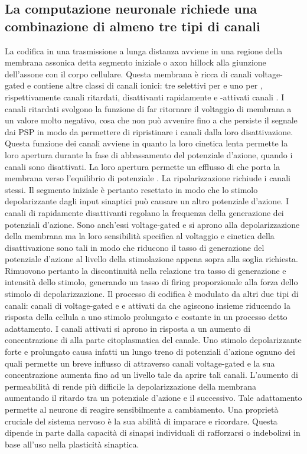 \subsection{La computazione neuronale richiede una combinazione di almeno tre tipi di canali }
La codifica in una trasmissione a lunga distanza avviene in una regione della membrana assonica detta segmento iniziale o axon hillock alla giunzione dell'assone con il corpo cellulare.
Questa membrana \`e ricca di canali  voltage-gated e contiene altre classi di canali ionici: tre selettivi per  e uno per , rispettivamente canali 
ritardati, disattivanti rapidamente e -attivati canali . I canali  ritardati svolgono la funzione di far ritornare il voltaggio di membrana a un valore molto
negativo, cosa che non pu\`o avvenire fino a che persiste il segnale dai PSP in modo da permettere di ripristinare i canali  dalla loro disattivazione. Questa funzione dei
canali  avviene in quanto la loro cinetica lenta  permette la loro apertura durante la fase di abbassamento del potenziale d'azione, quando i canali  sono disattivati. 
La loro apertura permette un efflusso di  che porta la membrana verso l'equilibrio di potenziale . La ripolarizzazione richiude i canali stessi. Il segmento iniziale \`e
pertanto resettato in modo che lo stimolo depolarizzante dagli input sinaptici pu\`o causare un altro potenziale d'azione. I canali di  rapidamente disattivanti regolano la
frequenza della generazione dei potenziali d'azione. Sono anch'essi voltage-gated e si aprono alla depolarizzazione della membrana ma la loro sensibilit\`a specifica al voltaggio
e cinetica della disattivazione sono tali in modo che riducono il tasso di generazione del potenziale d'azione al livello della stimolazione appena sopra alla soglia richiesta. 
Rimuovono pertanto la discontinuit\`a nella relazione tra tasso di generazione e intensit\`a dello stimolo, generando un tasso di firing proporzionale alla forza dello stimolo di 
depolarizzazione. Il processo di codifica \`e modulato da altri due tipi di canali: canali di  voltage-gated e e attivati da  che agiscono insieme 
riducendo la risposta della cellula a uno stimolo prolungato e costante in un processo detto adattamento. I canali  attivati si aprono in risposta a un aumento di 
concentrazione di  alla parte citoplasmatica del canale. Uno stimolo depolarizzante forte e prolungato causa infatti un lungo treno di potenziali d'azione ognuno dei quali
permette un breve influsso di  attraverso canali voltage-gated e la sua concentrazione aumenta fino ad un livello tale da aprire tali canali. L'aumento di permeabilit\`a 
di  rende pi\`u difficile la depolarizzazione della membrana aumentando il ritardo tra un potenziale d'azione e il successivo. Tale adattamento permette al neurone di reagire
sensibilmente a cambiamento. Una propriet\`a cruciale del sistema nervoso \`e la sua abilit\`a di imparare e ricordare. Questa dipende in parte dalla capacit\`a di sinapsi individuali
di rafforzarsi o indebolirsi in base all'uso nella plasticit\`a sinaptica. 
